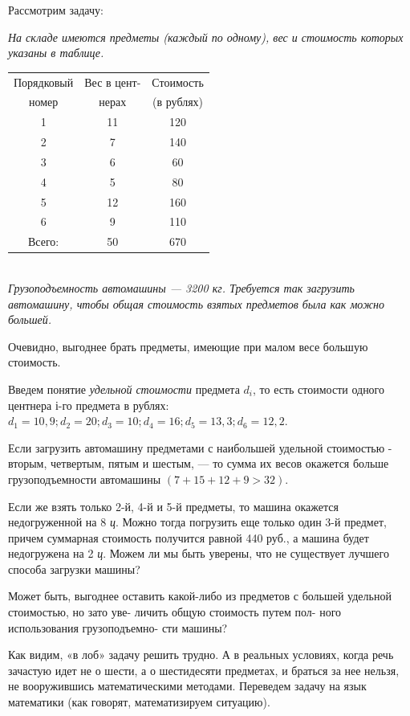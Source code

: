 \begin{multicols}{2}
Рассмотрим задачу:

\textit{На складе имеются предметы (каждый по одному), вес и стоимость которых указаны в таблице.}
\\

\noindent
\begin{tabular}{c|c|c}
    \hline
    Порядковый&Вес в цент-&Стоимость\\
    номер&нерах&(в рублях)\\
    \hline
    1&11&120\\
    2&7&140\\
    3&6&60\\
    4&5&80\\
    5&12&160\\
    6&9&110\\
    \hline
    Всего:&50&670
\end{tabular}
\\

\textit{Грузоподъемность автомашины — 3200 кг. Требуется так загрузить автомашину, чтобы общая стоимость взятых предметов была как можно большей.}

Очевидно, выгоднее брать предметы, имеющие при малом весе большую стоимость.

Введем понятие \textit{удельной стоимости} предмета $d_i$, то есть стоимости одного центнера $і$-го предмета в рублях: $d_1=10,9; d_2=20; d_3=10; d_4=16; d_5=13,3; d_6=12,2$.

Если загрузить автомашину предметами с наибольшей удельной стоимостью - вторым, четвертым, пятым
и шестым, — то сумма их весов окажется больше грузоподъемности автомашины $(7+15+12+9>32)$.

Если же взять только 2-й, 4-й и 5-й предметы, то машина окажется недогруженной на 8 \textit{ц}. Можно тогда погрузить еще только один 3-й предмет, причем суммарная стоимость получится равной 440 руб., а машина будет недогружена на 2 \textit{ц}. Можем ли мы быть уверены, что не существует лучшего способа загрузки машины?

Может быть, выгоднее оставить какой-либо из предметов с большей удельной стоимостью, но зато уве- личить общую стоимость путем пол- ного использования грузоподъемно-
сти машины?

Как видим, «в лоб» задачу решить трудно. А в реальных условиях, когда речь зачастую идет не о шести, а о шестидесяти предметах, и браться за нее нельзя, не вооружившись математическими методами. Переведем задачу на язык математики (как говорят, математизируем ситуацию).


\end{multicols}

